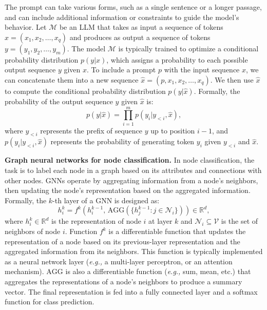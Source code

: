 \documentclass{article}
\newcommand{\eg}{\emph{e.g.,}\xspace}
\begin{document}
The prompt can take various forms, such as a single sentence or a longer passage, and can include additional information or constraints to guide the model's behavior. Let $\mathcal{M}$ be an LLM that takes as input a sequence of tokens $x=(x_1,x_2,\ldots,x_q)$ and produces as output a sequence of tokens $y=(y_1,y_2,\ldots,y_m)$. The model $\mathcal{M}$ is typically trained to optimize a conditional probability distribution $p(y|x)$, which assigns a probability to each possible output sequence $y$ given $x$. To include a prompt $p$ with the input sequence $x$, we can concatenate them into a new sequence $\hat{x}=(p,x_1,x_2,\ldots,x_q)$. We then use $\hat{x}$ to compute the conditional probability distribution $p(y|\hat{x})$. Formally, the probability of the output sequence $y$ given $\hat{x}$ is:
\begin{equation}
p(y|\hat{x})=\prod_{i=1}^m p(y_i|y_{<i}, \hat{x}),
\end{equation}
where $y_{<i}$ represents the prefix of sequence $y$ up to position $i-1$, and $p(y_i | y_{<i}, \hat{x})$ represents the probability of generating token $y_i$ given $y_{<i}$ and $\hat{x}$. 



\textbf{Graph neural networks for node classification.}
In node classification, the task is to label each node in a graph based on its attributes and connections with other nodes. GNNs operate by aggregating information from a node's neighbors, then updating the node's representation based on the aggregated information. Formally, the $k$-th layer of a GNN is designed as:
\begin{equation}
    h_i^{k} = f^{k}(h_i^{k-1}, \, \textrm{AGG}(\{h_j^{k-1}: j\in \mathcal{N}_i\})) \in \mathbb{R}^d,
\end{equation}
where $h_i^{k}\in\mathbb{R}^{d}$ is the representation of node $i$ at layer $k$ and $\mathcal{N}_i \subseteq \mathcal{V}$ is the set of neighbors of node $i$. Function $f^{k}$ is a differentiable function that updates the representation of a node based on its previous-layer representation and the aggregated information from its neighbors. This function is typically implemented as a neural network layer (\eg a multi-layer perceptron, or an attention mechanism). $\textrm{AGG}$ is also a differentiable function (\eg sum, mean, etc.) that aggregates the representations of a node's neighbors to produce a summary vector. The final representation is fed into a fully connected layer and a softmax function for class prediction.
\end{document}
